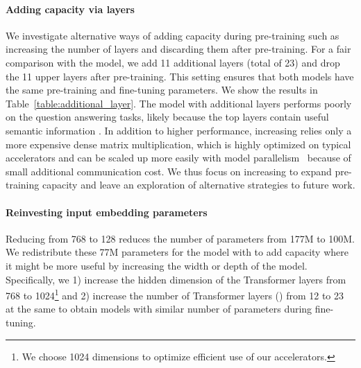 \documentclass{article} \usepackage{iclr2021_conference,times}
\begin{document}
\paragraph{Adding capacity via layers} We investigate alternative ways of adding capacity during pre-training such as increasing the number of layers and discarding them after pre-training.
For a fair comparison with the  model, we add 11 additional layers (total of 23) and drop the 11 upper layers after pre-training. This setting ensures that both models have the same pre-training and fine-tuning parameters. We show the results in Table~\ref{table:additional_layer}. The model with additional layers performs poorly on the question answering tasks, likely because the top layers contain useful semantic information \citep{Tenney2019}. 
In addition to higher performance, increasing  relies only a more expensive dense matrix multiplication, which is highly optimized on typical accelerators and can be scaled up more easily with model parallelism~\citep{Shazeer2018} because of small additional communication cost.
We thus focus on increasing  to expand pre-training capacity and leave an exploration of alternative strategies to future work.




\begin{table*}[t]
\caption{Effect of additional capacity via more Transformer layers during pre-training ().}
\label{table:additional_layer}
\begin{center}
\end{center}
\end{table*}

\paragraph{Reinvesting input embedding parameters} Reducing  from 768 to 128 reduces the number of parameters from 177M to 100M. We redistribute these 77M parameters for the model with  to add capacity where it might be more useful by increasing the width or depth of the model. Specifically, we 1) increase the hidden dimension  of the Transformer layers from 768 to 1024\footnote{We choose 1024 dimensions to optimize efficient use of our accelerators.} and 2) increase the number of Transformer layers () from 12 to 23 at the same  to obtain models with similar number of parameters during fine-tuning. 
\end{document}
